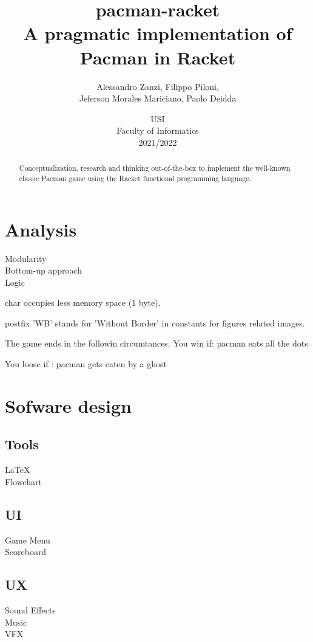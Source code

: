 \documentclass{article}
\title{
\textbf{pacman-racket} \\
A pragmatic implementation of Pacman in Racket
}
\author{
    Alessandro Zanzi,
    Filippo Piloni,\\
    Jeferson Morales Mariciano,
    Paolo Deidda
}
\date{
USI \\
Faculty of Informatics \\
[\baselineskip]  2021/2022
}
\begin{document}
\begin{titlepage}
\maketitle

\end{titlepage}
 \begin{abstract}
Conceptualization, research and thinking out-of-the-box
to implement the well-known classic Pacman game
using the Racket functional programming language.
 \end{abstract}
\clearpage
 \tableofcontents
 \clearpage
 \section{Analysis}
 Modularity\\
 Bottom-up approach\\
 Logic

 char occupies less memory space (1 byte).

 postfix  'WB' stands for 'Without Border' in constants for figures related images.

 The game ends in the followin circumtances.
 You win if:
 pacman eats all the dots

 You loose if :
 pacman gets eaten by a ghost


 \section{Sofware design}
 \subsection{Tools}
 \LaTeX \\
 Flowchart

 \subsection{UI}
 Game Menu\\
 Scoreboard

 \subsection{UX}
Sound Effects\\
Music\\
VFX
\end{document}
